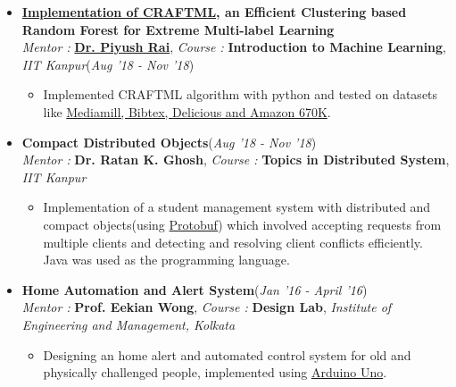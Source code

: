 \documentclass[10pt]{extarticle}
\begin{document}
\begin{itemize}



\item \textbf{ \href{https://github.com/NirjharRoy/CRAFTML}{Implementation of CRAFTML}, an Efficient Clustering based Random Forest for Extreme Multi-label Learning} \\
{\textit{Mentor : }}\textbf{\href{https://www.cse.iitk.ac.in/users/piyush/}{Dr. Piyush Rai}}, \textit{{Course : }}\textbf{Introduction to Machine Learning}, \textit{IIT Kanpur}\hfill\hfill(\textit{Aug '18 - Nov '18})
\begin{itemize}
\item Implemented CRAFTML algorithm with python and tested on datasets like \href{http://manikvarma.org/downloads/XC/XMLRepository.html}{Mediamill, Bibtex, Delicious and Amazon 670K}.

\end{itemize}






\item \textbf{Compact Distributed Objects}\hfill\hfill(\textit{Aug '18 - Nov '18})\\{\textit{Mentor : }}\textbf{{Dr. Ratan K. Ghosh}}, \textit{{Course : }}\textbf{Topics in Distributed System}, \textit{IIT Kanpur}
\begin{itemize}
\item Implementation of a student management system with distributed and compact objects(using \href{https://developers.google.com/protocol-buffers}{Protobuf}) which involved accepting requests from multiple clients and detecting and resolving client conflicts efficiently. Java was used as the programming language.
\end{itemize}







\item \textbf{Home Automation and Alert System}\hfill\hfill(\textit{Jan '16 - April '16})\\{\textit{Mentor : }}\textbf{{Prof. Eekian Wong}}, \textit{{Course : }}\textbf{Design Lab}, \textit{Institute of Engineering and Management, Kolkata}
\begin{itemize}
\item Designing an home alert and automated control system for old and physically challenged people, implemented using \href{https://www.arduino.cc/en/Guide/ArduinoUno}{Arduino Uno}.
\end{itemize}




\end{itemize}
\end{document}
